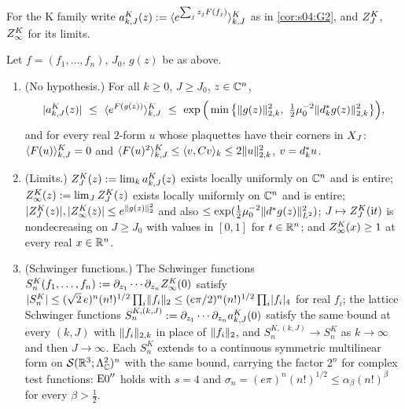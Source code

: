For the K family write $a^K_{k,J}(z):=\langle e^{\sum_jz_jF(f_j)}\rangle^{K}_{k,J}$ as in \cref{cor:s04:G2}, and $Z^{K}_{J}$, $Z^{K}_{\infty}$ for its limits.

\begin{theorem}\label{thm:s05:CK}
Let $f=(f_1,\dots,f_n)$, $J_0$, $g(z)$ be as above.
\begin{enumerate}[label=\textup{(\alph*)},leftmargin=*]
\item \textup{(No hypothesis.)} For all $k\ge0$, $J\ge J_0$, $z\in\mathbb C^n$,
\[
|a^K_{k,J}(z)|\ \le\ \avK{e^{F(g(z))}}\ \le\ \exp\Big(\min\big\{\norm{g(z)}^2_{2,k},\ \tfrac12\lmu^{-2}\norm{\dstar_kg(z)}^2_{2,k}\big\}\Big),
\]
and for every real $2$-form $u$ whose plaquettes have their corners in $X_J$: $\langle F(u)\rangle^{K}_{k,J}=0$ and $\langle F(u)^2\rangle^{K}_{k,J}\le\langle v,Cv\rangle_k\le2\lVert u\rVert^2_{2,k}$, $v=d^{*}_ku$.
\item \textup{(Limits.)} $Z^{K}_{J}(z):=\lim_ka^K_{k,J}(z)$ exists locally uniformly on $\mathbb C^n$ and is entire; $Z^{K}_{\infty}(z):=\lim_JZ^{K}_{J}(z)$ exists locally uniformly on $\mathbb C^n$ and is entire; $|Z^{K}_{J}(z)|,|Z^{K}_{\infty}(z)|\le e^{\lVert g(z)\rVert_2^2}$ and also $\le\exp(\frac12\mu_0^{-2}\lVert d^{*} g(z)\rVert^2_{L^2})$; $J\mapsto Z^{K}_{J}(\mathrm it)$ is nondecreasing on $J\ge J_0$ with values in $[0,1]$ for $t\in\mathbb R^n$; and $Z^{K}_{\infty}(x)\ge1$ at every real $x\in\mathbb R^n$.
\item \textup{(Schwinger functions.)} The Schwinger functions $S^K_n(f_1,\dots,f_n):=\partial_{z_1}\cdots\partial_{z_n}Z^{K}_{\infty}(0)$ satisfy $|S^K_n|\le(\sqrt2\,e)^n(n!)^{1/2}\prod_i\lVert f_i\rVert_2\le(e\pi/2)^n(n!)^{1/2}\prod_i\lvert f_i\rvert_{4}$ for real $f_i$; the lattice Schwinger functions $S^{K,(k,J)}_n:=\partial_{z_1}\cdots\partial_{z_n}a^K_{k,J}(0)$ satisfy the same bound at every $(k,J)$ with $\lVert f_i\rVert_{2,k}$ in place of $\lVert f_i\rVert_2$, and $S^{K,(k,J)}_n\to S^K_n$ as $k\to\infty$ and then $J\to\infty$. Each $S^K_n$ extends to a continuous symmetric multilinear form on $\mathcal S(\mathbb R^3;\Lambda^2_{\mathbb C})^n$ with the same bound, carrying the factor $2^n$ for complex test functions: $\mathrm{E0}''$ holds with $s=4$ and $\sigma_n=(e\pi)^n(n!)^{1/2}\le\alpha_\beta(n!)^\beta$ for every $\beta>\frac12$.
\end{enumerate}
\end{theorem}

